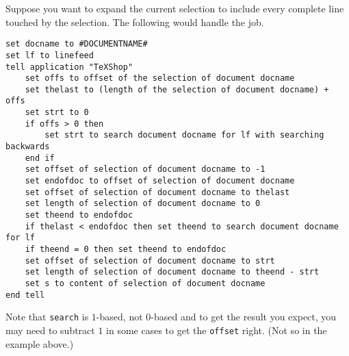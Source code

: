 \documentclass[11pt]{amsart}
\begin{document}
Suppose you want to expand the current selection to include every complete line touched by the selection. The following would handle the job.
\begin{verbatim}
set docname to #DOCUMENTNAME#
set lf to linefeed
tell application "TeXShop"
    set offs to offset of the selection of document docname
    set thelast to (length of the selection of document docname) + offs
    set strt to 0
    if offs > 0 then 
        set strt to search document docname for lf with searching backwards
    end if
    set offset of selection of document docname to -1
    set endofdoc to offset of selection of document docname
    set offset of selection of document docname to thelast
    set length of selection of document docname to 0
    set theend to endofdoc
    if thelast < endofdoc then set theend to search document docname for lf
    if theend = 0 then set theend to endofdoc
    set offset of selection of document docname to strt
    set length of selection of document docname to theend - strt
    set s to content of selection of document docname
end tell
\end{verbatim}
Note that {\tt search} is $1$-based, not $0$-based and to get the result you expect, you may need to subtract $1$ in some cases  to get the {\tt offset} right. (Not so in the example above.)
\end{document}
